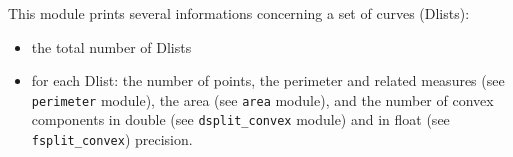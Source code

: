 This module prints several informations concerning a set of curves (Dlists):
\begin{itemize}
\item the total number of Dlists
\item for each Dlist: the number of points, the 
perimeter and related measures (see \verb+perimeter+ module),
the area (see \verb+area+ module), and the number of convex
components in double (see \verb+dsplit_convex+ module) and in
float (see \verb+fsplit_convex+) precision.
\end{itemize}
